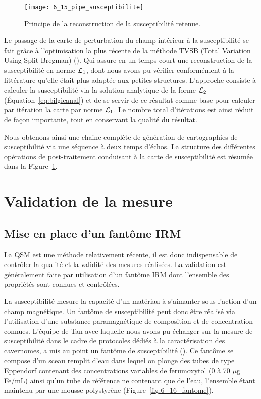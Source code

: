 {%
\begin{figure}[!t]
\centering
\texttt{[image: 6\_15\_pipe\_susceptibilite]}
\caption{ Principe de la reconstruction de la susceptibilité retenue.}
\label{fig:6_15_pipe_susceptibilite}	
\end{figure}
Le passage de la carte de perturbation du champ intérieur à la susceptibilité se fait grâce à
l’optimisation la plus récente de la méthode TVSB (Total Variation Using Split Bregman) (\cite{Bilgic2014}). Qui assure
en un temps court une reconstruction de la susceptibilité en norme ${\cal L}_1$, dont nous avons pu vérifier
conformément à la littérature qu’elle était plus adaptée aux petites structures. L’approche consiste à
calculer la susceptibilité via la solution analytique de la forme ${\cal L}_2$ (Équation~\ref{eq:bilgicanal}) et de se servir de ce
résultat comme base pour calculer par itération la carte par norme ${\cal L}_1$. Le nombre total d’itérations est
ainsi réduit de façon importante, tout en conservant la qualité du résultat.

Nous obtenons ainsi une chaine complète de génération de cartographies de susceptibilité via
une séquence à deux temps d’échos. La structure des différentes opérations de post-traitement
conduisant à la carte de susceptibilité est résumée dans la Figure~\ref{fig:6_15_pipe_susceptibilite}.
\section{Validation de la mesure}
\subsection{Mise en place d’un fantôme IRM}
La QSM est une méthode relativement récente, il est donc indispensable de contrôler la qualité
et la validité des mesures réalisées. La validation est généralement faite par utilisation d’un fantôme
IRM dont l’ensemble des propriétés sont connues et contrôlées.

La susceptibilité mesure la capacité d’un matériau à s’aimanter sous l’action d’un champ
magnétique. Un fantôme de susceptibilité peut donc être réalisé via l’utilisation d’une substance
paramagnétique de composition et de concentration connues. L’équipe de Tan avec laquelle nous
avons pu échanger sur la mesure de susceptibilité dans le cadre de protocoles dédiés à la
caractérisation des cavernomes, a mis au point un fantôme de susceptibilité (\cite{tan2014}). Ce fantôme se
compose d’un sceau remplit d’eau dans lequel on plonge des tubes de type Eppendorf contenant des
concentrations variables de ferumoxytol (0 à 70 $\mu$g Fe/mL) ainsi qu’un tube de référence ne contenant
que de l’eau, l’ensemble étant maintenu par une mousse polystyrène (Figure~\ref{fig:6_16_fantome}).

}
